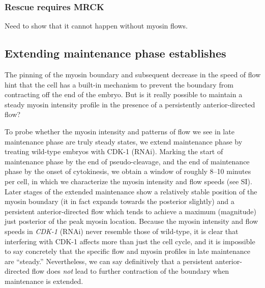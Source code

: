 \documentclass[11pt]{article}
\newcommand{\red}[1]{\color{red}#1\normalcolor}
\newcommand{\6}[1]{#1_{\text{6}}}
\newcommand{\3}[1]{#1_{\text{3}}}
\begin{document}
\subsubsection{Rescue requires MRCK}
\red{Need to show that it cannot happen without myosin flows.}

\subsection{Extending maintenance phase establishes }
The pinning of the myosin boundary and subsequent decrease in the speed of flow hint that the cell has a built-in mechanism to prevent the boundary from contracting off the end of the embryo. But is it really possible to maintain a steady myosin intensity profile in the presence of a persistently anterior-directed flow? 

To probe whether the myosin intensity and patterns of flow we see in late maintenance phase are truly steady states, we extend maintenance phase by treating wild-type embryos with CDK-1 (RNAi). Marking the start of maintenance phase by the end of pseudo-cleavage, and the end of maintenance phase by the onset of cytokinesis, we obtain a window of roughly 8--10 minutes per cell, in which we characterize the myosin intensity and flow speeds (see SI). Later stages of the extended maintenance show a relatively stable position of the myosin boundary (it in fact expands towards the posterior slightly) and a persistent anterior-directed flow which tends to achieve a maximum (magnitude) just posterior of the peak myosin location. Because the myosin intensity and flow speeds in \emph{CDK-1} (RNAi) never resemble those of wild-type, it is clear that interfering with CDK-1 affects more than just the cell cycle, and it is impossible to say concretely that the specific flow and myosin profiles in late maintenance are ``steady.'' Nevertheless, we can say definitively that a persistent anterior-directed flow does \emph{not} lead to further contraction of the boundary when maintenance is extended.
\end{document}
